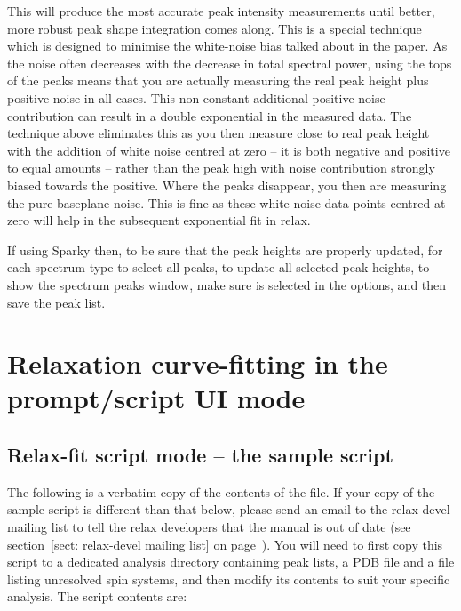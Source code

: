 This will produce the most accurate peak intensity measurements until better, more robust peak shape integration comes along.  This is a special technique which is designed to minimise the white-noise bias talked about in the \citet{Viles01} paper.  As the noise often decreases with the decrease in total spectral power, using the tops of the peaks means that you are actually measuring the real peak height plus positive noise in all cases.  This non-constant additional positive noise contribution can result in a double exponential in the measured data.  The technique above eliminates this as you then measure close to real peak height with the addition of white noise centred at zero -- it is both negative and positive to equal amounts -- rather than the peak high with noise contribution strongly biased towards the positive.  Where the peaks disappear, you then are measuring the pure baseplane noise.  This is fine as these white-noise data points centred at zero will help in the subsequent exponential fit in relax. 

If using Sparky then, to be sure that the peak heights are properly updated, for each spectrum type  to select all peaks,  to update all selected peak heights,  to show the spectrum peaks window, make sure  is selected in the options, and then save the peak list.



\section{Relaxation curve-fitting in the prompt/script UI mode}



\subsection{Relax-fit script mode -- the sample script}

The following is a verbatim copy of the contents of the  file.  If your copy of the sample script is different than that below, please send an email to the relax-devel mailing list to tell the relax developers that the manual is out of date (see section~\ref{sect: relax-devel mailing list} on page~\pageref{sect: relax-devel mailing list}).  You will need to first copy this script to a dedicated analysis directory containing peak lists, a PDB file and a file listing unresolved spin systems, and then modify its contents to suit your specific analysis.  The script contents are:

